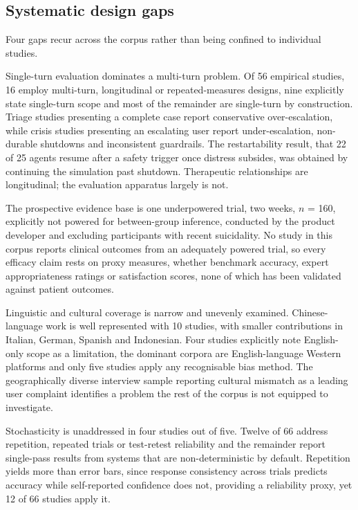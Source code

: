 \documentclass[11pt]{article}
\begin{document}
	\subsection{Systematic design gaps}
	
	Four gaps recur across the corpus rather than being confined to individual studies.
	
	Single-turn evaluation dominates a multi-turn problem. Of 56 empirical studies, 16 employ multi-turn, longitudinal or repeated-measures designs, nine explicitly state single-turn scope and most of the remainder are single-turn by construction. Triage studies presenting a complete case report conservative over-escalation, while crisis studies presenting an escalating user report under-escalation, non-durable shutdowns and inconsistent guardrails. The restartability result, that 22 of 25 agents resume after a safety trigger once distress subsides, was obtained by continuing the simulation past shutdown. Therapeutic relationships are longitudinal; the evaluation apparatus largely is not.
	
	The prospective evidence base is one underpowered trial, two weeks, $n$ = 160, explicitly not powered for between-group inference, conducted by the product developer and excluding participants with recent suicidality. No study in this corpus reports clinical outcomes from an adequately powered trial, so every efficacy claim rests on proxy measures, whether benchmark accuracy, expert appropriateness ratings or satisfaction scores, none of which has been validated against patient outcomes.
	
	Linguistic and cultural coverage is narrow and unevenly examined. Chinese-language work is well represented with 10 studies, with smaller contributions in Italian, German, Spanish and Indonesian. Four studies explicitly note English-only scope as a limitation, the dominant corpora are English-language Western platforms and only five studies apply any recognisable bias method. The geographically diverse interview sample reporting cultural mismatch as a leading user complaint identifies a problem the rest of the corpus is not equipped to investigate.
	
	Stochasticity is unaddressed in four studies out of five. Twelve of 66 address repetition, repeated trials or test-retest reliability and the remainder report single-pass results from systems that are non-deterministic by default. Repetition yields more than error bars, since response consistency across trials predicts accuracy while self-reported confidence does not, providing a reliability proxy, yet 12 of 66 studies apply it.
	
\end{document}
